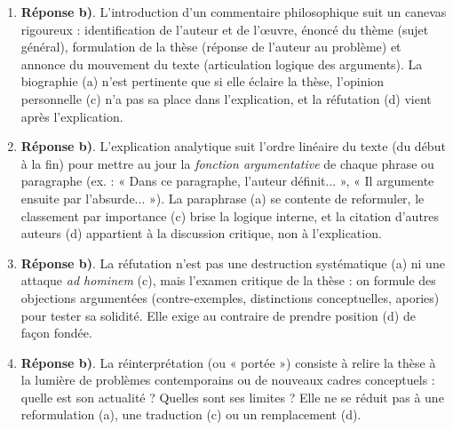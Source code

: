 \documentclass[11pt]{article}
\newcommand{\cle}[1]{{\popxbold\color{popdark}#1}}
\begin{document}
\begin{corrige}
\begin{enumerate}
\item \textbf{Réponse b)}. L'introduction d'un commentaire philosophique suit un canevas rigoureux : identification de l'auteur et de l'œuvre, énoncé du \cle{thème} (sujet général), formulation de la \cle{thèse} (réponse de l'auteur au problème) et annonce du \cle{mouvement du texte} (articulation logique des arguments). La biographie (a) n'est pertinente que si elle éclaire la thèse, l'opinion personnelle (c) n'a pas sa place dans l'explication, et la réfutation (d) vient après l'explication.
\item \textbf{Réponse b)}. L'explication \cle{analytique} suit l'ordre linéaire du texte (du début à la fin) pour mettre au jour la \emph{fonction argumentative} de chaque phrase ou paragraphe (ex. : « Dans ce paragraphe, l'auteur définit... », « Il argumente ensuite par l'absurde... »). La paraphrase (a) se contente de reformuler, le classement par importance (c) brise la logique interne, et la citation d'autres auteurs (d) appartient à la discussion critique, non à l'explication.
\item \textbf{Réponse b)}. La \cle{réfutation} n'est pas une destruction systématique (a) ni une attaque \emph{ad hominem} (c), mais l'examen critique de la thèse : on formule des \cle{objections} argumentées (contre-exemples, distinctions conceptuelles, apories) pour tester sa solidité. Elle exige au contraire de prendre position (d) de façon fondée.
\item \textbf{Réponse b)}. La \cle{réinterprétation} (ou « portée ») consiste à relire la thèse à la lumière de problèmes contemporains ou de nouveaux cadres conceptuels : quelle est son actualité ? Quelles sont ses limites ? Elle ne se réduit pas à une reformulation (a), une traduction (c) ou un remplacement (d).
\end{enumerate}
\end{corrige}
\end{document}

